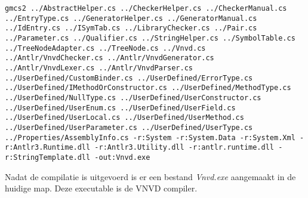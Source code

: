\begin{lstlisting}
gmcs2 ../AbstractHelper.cs ../CheckerHelper.cs ../CheckerManual.cs ../EntryType.cs ../GeneratorHelper.cs ../GeneratorManual.cs ../IdEntry.cs ../ISymTab.cs ../LibraryChecker.cs ../Pair.cs ../Parameter.cs ../Qualifier.cs ../StringHelper.cs ../SymbolTable.cs ../TreeNodeAdapter.cs ../TreeNode.cs ../Vnvd.cs ../Antlr/VnvdChecker.cs ../Antlr/VnvdGenerator.cs ../Antlr/VnvdLexer.cs ../Antlr/VnvdParser.cs ../UserDefined/CustomBinder.cs ../UserDefined/ErrorType.cs ../UserDefined/IMethodOrConstructor.cs ../UserDefined/MethodType.cs ../UserDefined/NullType.cs ../UserDefined/UserConstructor.cs ../UserDefined/UserEnum.cs ../UserDefined/UserField.cs ../UserDefined/UserLocal.cs ../UserDefined/UserMethod.cs ../UserDefined/UserParameter.cs ../UserDefined/UserType.cs ../Properties/AssemblyInfo.cs -r:System -r:System.Data -r:System.Xml -r:Antlr3.Runtime.dll -r:Antlr3.Utility.dll -r:antlr.runtime.dll -r:StringTemplate.dll -out:Vnvd.exe
\end{lstlisting}

Nadat de compilatie is uitgevoerd is er een bestand \textit{Vnvd.exe} aangemaakt in de huidige map. Deze executable is de VNVD compiler.
